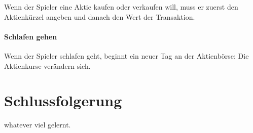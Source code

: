 \documentclass[paper=a4, fontsize=11pt]{scrartcl}
\numberwithin{equation}{section}		%
\numberwithin{figure}{section}			%
\numberwithin{table}{section}				%
\begin{document}
	Wenn der Spieler eine Aktie kaufen oder verkaufen will, muss er zuerst den Aktienkürzel angeben und danach den Wert der Transaktion.
	
	\paragraph{Schlafen gehen}
	
	Wenn der Spieler schlafen geht, beginnt ein neuer Tag an der Aktienbörse: Die Aktienkurse verändern sich. 
	
	\section{Schlussfolgerung}
	
	whatever viel gelernt.
	
\end{document}
